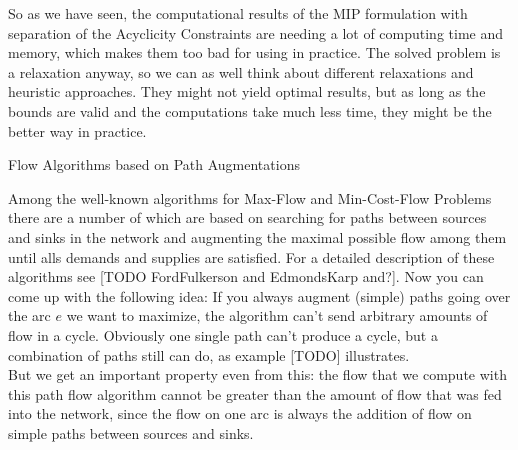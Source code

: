 So as we have seen, the computational results of the MIP formulation with separation of the Acyclicity Constraints 
are needing a lot of computing time and memory, which makes them too bad for using in practice. The solved problem is a 
relaxation anyway, so we can as well think about different relaxations and heuristic approaches. They might not yield 
optimal results, but as long as the bounds are valid and the computations take much less time, they might be the better 
way in practice.

\caption{Flow Algorithms based on Path Augmentations}

Among the well-known algorithms for Max-Flow and Min-Cost-Flow Problems there are a number of which are based on 
searching for paths between sources and sinks in the network and augmenting the maximal possible flow among them until 
alls demands and supplies are satisfied. For a detailed description of these algorithms see [TODO FordFulkerson and 
EdmondsKarp and?]. 
Now you can come up with the following idea: If you always augment (simple) paths going over the arc $e$ we want to 
maximize, the algorithm can't send arbitrary amounts of flow in a cycle. Obviously one single path can't produce a 
cycle, but a combination of paths still can do, as example [TODO] illustrates. \\

But we get an important property even from this: the flow that we compute with this path flow algorithm cannot be 
greater than the amount of flow that was fed into the network, since the flow on one arc is always the addition of 
flow on simple paths between sources and sinks.





